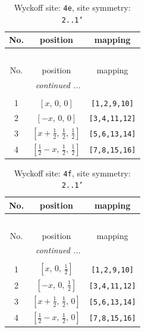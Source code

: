 \documentclass[fleqn,8pt]{jsarticle}
\begin{document}
\begin{longtable}{ccc}
\caption{Wyckoff site: {\tt 4e}, site symmetry: {\tt 2..1'}}
 \\
 \hline \hline
No. & position & mapping \\ \hline \endfirsthead

\multicolumn{2}{l}{\tablename\ \thetable{}} \\
 \hline \hline
No. & position & mapping \\ \hline \endhead

 \hline \hline
\multicolumn{2}{r}{\footnotesize\it continued ...} \\ \endfoot

 \hline \hline
\multicolumn{2}{r}{} \\ \endlastfoot

1 & $\left[ x,\, 0,\, 0 \right]$ & {\tt [1,2,9,10]} \\ \hline
2 & $\left[ - x,\, 0,\, 0 \right]$ & {\tt [3,4,11,12]} \\ \hline
3 & $\left[ x + \frac{1}{2},\, \frac{1}{2},\, \frac{1}{2} \right]$ & {\tt [5,6,13,14]} \\ \hline
4 & $\left[ \frac{1}{2} - x,\, \frac{1}{2},\, \frac{1}{2} \right]$ & {\tt [7,8,15,16]} \\
\end{longtable}
\renewcommand{\arraystretch}{1.2}
\begin{longtable}{ccc}
\caption{Wyckoff site: {\tt 4f}, site symmetry: {\tt 2..1'}}
 \\
 \hline \hline
No. & position & mapping \\ \hline \endfirsthead

\multicolumn{2}{l}{\tablename\ \thetable{}} \\
 \hline \hline
No. & position & mapping \\ \hline \endhead

 \hline \hline
\multicolumn{2}{r}{\footnotesize\it continued ...} \\ \endfoot

 \hline \hline
\multicolumn{2}{r}{} \\ \endlastfoot

1 & $\left[ x,\, 0,\, \frac{1}{2} \right]$ & {\tt [1,2,9,10]} \\ \hline
2 & $\left[ - x,\, 0,\, \frac{1}{2} \right]$ & {\tt [3,4,11,12]} \\ \hline
3 & $\left[ x + \frac{1}{2},\, \frac{1}{2},\, 0 \right]$ & {\tt [5,6,13,14]} \\ \hline
4 & $\left[ \frac{1}{2} - x,\, \frac{1}{2},\, 0 \right]$ & {\tt [7,8,15,16]} \\
\end{longtable}
\end{document}
